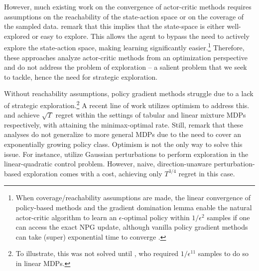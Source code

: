 However, much existing work \citep{abbasi2019politex, neu2017unified, liu2023neuralproximaltrustregionpolicy, bhandari2024global, agarwal2021theory, cen2022fast, gaur2024closing} on the convergence of actor-critic methods requires assumptions on the reachability of the state-action space or on the coverage of the sampled data. \citet{liu2023optimistic} remark that this implies that the state-space is either well-explored or easy to explore. This allows the agent to bypass the need to actively explore the state-action space, making learning significantly easier.\footnote{When coverage/reachability assumptions are made, the linear convergence of policy-based methods \citep{lan2022policymirrordescentreinforcement, xiao2022convergence, yuan2023linear, chen2022offpolicylinearpolicy} and the gradient domination lemma \citep{kumar2024improvedsamplecomplexityglobal, mei2022globalconvergenceratessoftmax} enable the natural actor-critic algorithm to learn an $\epsilon$-optimal policy within $1/\epsilon^2$ samples if one can access the exact NPG update, although vanilla policy gradient methods can take (super) exponential time to converge \citep{li2021softmax}.} Therefore, these approaches analyze actor-critic methods from an optimization perspective and do not address the problem of exploration \citep{efroni2020optimisticpolicyoptimizationbandit} -- a salient problem that we seek to tackle, hence the need for strategic exploration. 

Without reachability assumptions, policy gradient methods struggle due to a lack of strategic exploration.\footnote{To illustrate, this was not solved until \citet{agarwal2020pcpgpolicycoverdirected}, who required $1/\epsilon^{11}$ samples to do so in linear MDPs.} A recent line of work utilizes optimism to address this. \citet{efroni2020optimisticpolicyoptimizationbandit, wu2022nearlyoptimalpolicyoptimization} and \citet{cai2020provably} achieve $\sqrt{T}$ regret within the settings of tabular and linear mixture MDPs respectively, with \citet{wu2022nearlyoptimalpolicyoptimization} attaining the minimax-optimal rate.  
Still, \citet{zhong2023theoretical, liu2023optimistic} remark that these analyses do not generalize to more general MDPs due to the need to cover an exponentially growing policy class. Optimism is not the only way to solve this issue. For instance, \citet{huang2024sublinearregretclasscontinuoustime} utilize Gaussian perturbations to perform exploration in the linear-quadratic control problem. However, naive, direction-unaware perturbation-based exploration comes with a cost, achieving only $T^{3/4}$ regret in this case.

